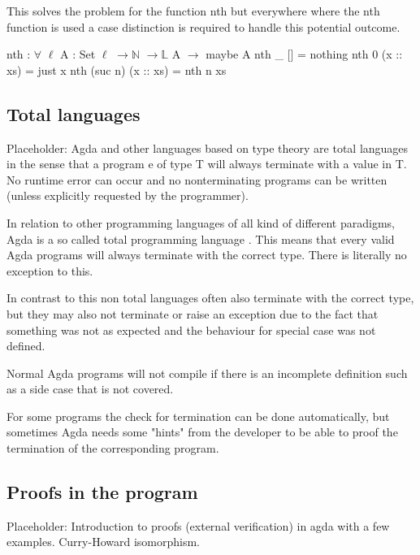 This solves the problem for the function nth but everywhere where the nth function is used a case distinction is required to handle this potential outcome.
\begin{codesnippet}[mathescape=true, caption={Definition of nth function in Agda}, label={codeSnippet:list_nth}]
nth : $\forall$ {$\ell$} {A : Set $\ell$} $\rightarrow \mathbb{N}$ $\rightarrow \mathbb{L}$ A $\rightarrow$ maybe A
nth _ [] = nothing
nth 0 (x :: xs) = just x
nth (suc n) (x :: xs) = nth n xs
\end{codesnippet}

\subsection{Total languages}\label{section:total_languages}
Placeholder: Agda and other languages based on type theory are total languages in the sense that a program e of type T will always terminate with a value in T. 
No runtime error can occur and no nonterminating programs can be written (unless explicitly requested by the programmer)\cite{AgdaReadTheDocs}.

In relation to other programming languages of all kind of different paradigms, Agda is a so called total programming language \cite{AgdaReadTheDocs}.
This means that every valid Agda programs will always terminate with the correct type. There is literally no exception to this.

In contrast to this non total languages often also terminate with the correct type, but they may also not terminate or raise an exception due to the fact that something was not as expected and the behaviour for special case was not defined.

Normal Agda programs will not compile if there is an incomplete definition such as a side case that is not covered.

For some programs the check for termination can be done automatically, but sometimes Agda needs some "hints" from the developer to be able to proof the termination of the corresponding program.

\subsection{Proofs in the program}
Placeholder: Introduction to proofs (external verification) in agda with a few examples.
Curry-Howard isomorphism.
\cite{norell:deptyped, 10.1145/2841316, plfa2019}

